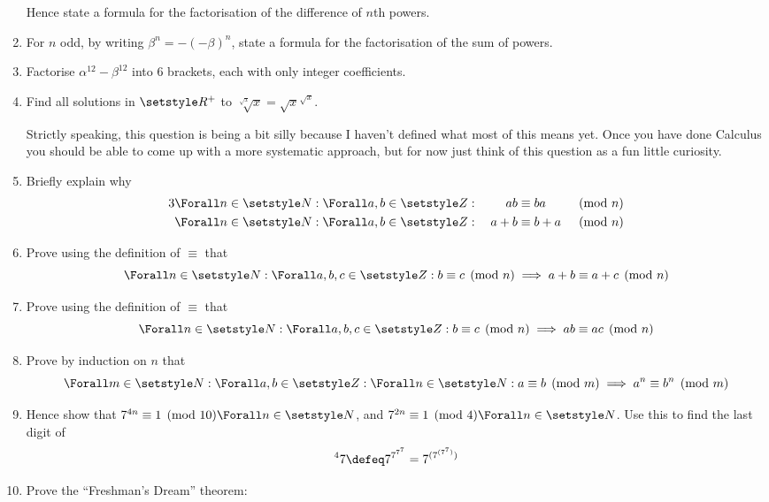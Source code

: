 \begin{enumerate}
  Hence state a formula for the factorisation of the difference of \(n\)th
  powers.
 \item
  For \(n\) odd, by writing \(\beta^n = -(-\beta)^n\), state a formula for the
  factorisation of the sum of powers.
 \item
  Factorise \(\alpha^{12} - \beta^{12}\) into 6 brackets, each with only integer
  coefficients.
 \item
  Find all solutions in \(\Reals^+\) to
  \(\sqrt[\sqrt x]x = {\sqrt x}^{\sqrt x}\).

  Strictly speaking, this question is being a bit silly because I haven't
  defined what most of this means yet. Once you have done Calculus you should be
  able to come up with a more systematic approach, but for now just think of
  this question as a fun little curiosity.
 \item
  Briefly explain why
  \begin{alignat*}3
   \Forall n \in \Naturals :
   \Forall a, b \in \Integers &:{}
   &ab&\equiv ba &&\pmod n \\
   \Forall n \in \Naturals :
   \Forall a, b \in \Integers &:{}
   &a + b&\equiv b + a &&\pmod n
  \end{alignat*}
 \item
  Prove using the definition of \(\equiv\) that
  \begin{equation*}
   \Forall n \in \Naturals :
   \Forall a, b, c \in \Integers :
   b \equiv c \pmod n \implies
   a + b \equiv a + c \pmod n
  \end{equation*}
 \item
  Prove using the definition of \(\equiv\) that
  \begin{equation*}
   \Forall n \in \Naturals :
   \Forall a, b, c \in \Integers :
   b \equiv c \pmod n \implies
   ab \equiv ac \pmod n
  \end{equation*}
 \item
  Prove by induction on \(n\) that
  \begin{equation*}
    \Forall m \in \Naturals :
    \Forall a, b \in \Integers :
    \Forall n \in \Naturals :
    a \equiv b \pmod m \implies
    a^n \equiv b^n \pmod m
  \end{equation*}
 \item
  Hence show that \(7^{4n} \equiv 1 \pmod{10} \Forall n \in \Naturals\), and
  \(7^{2n} \equiv 1 \pmod 4 \Forall n \in \Naturals\). Use
  this to find the last digit of
  \begin{equation*}
   {}^4 7 \defeq 7^{7^{7^7}} = 7^{(7^{(7^7)})}
  \end{equation*}
 \item
  Prove the ``Freshman's Dream'' theorem:


\end{enumerate}
